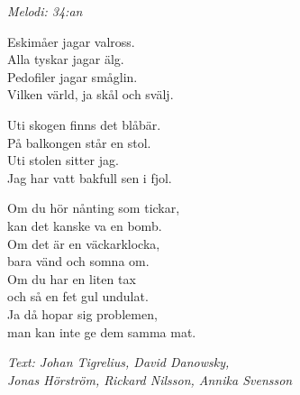 {\footnotesize\textit{Melodi: 34:an}}\par
\vspace{10pt}
Eskimåer jagar valross.\\
Alla tyskar jagar älg.\\
Pedofiler jagar småglin.\\
Vilken värld, ja skål och svälj.\par
\vspace{10pt}
Uti skogen finns det blåbär.\\
På balkongen står en stol.\\
Uti stolen sitter jag.\\
Jag har vatt bakfull sen i fjol.\par
\vspace{10pt}
Om du hör nånting som tickar,\\
kan det kanske va en bomb.\\
Om det är en väckarklocka,\\
bara vänd och somna om.\\
Om du har en liten tax\\
och så en fet gul undulat.\\
\revrpt Ja då hopar sig problemen,\\
man kan inte ge dem samma mat.\rpt\par
\vspace{10pt}
{\footnotesize\textit{Text: Johan Tigrelius, David Danowsky,\\ Jonas Hörström, Rickard Nilsson, Annika Svensson}}
